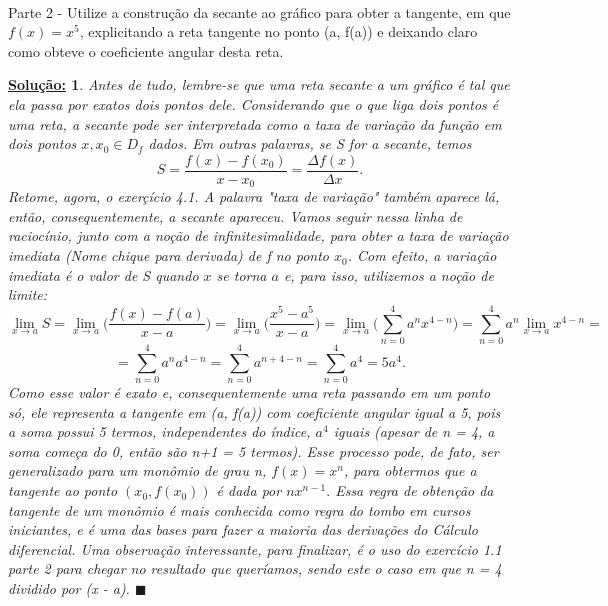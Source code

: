 \documentclass{article}
\newtheorem*{sol*}{\underline{Solu\c c\~ao:}}
\renewcommand\qedsymbol{$\blacksquare$}
\begin{document}
\paragraph{} Parte 2 - Utilize a constru\c c\~ao da secante ao gr\'afico para obter a tangente, em que $f(x) = x^5$, explicitando a reta tangente no ponto (a, f(a)) e deixando claro como obteve o coeficiente angular desta reta.
\begin{sol*}
	Antes de tudo, lembre-se que uma reta secante a um gr\'afico \'e tal que ela passa por exatos dois pontos dele. Considerando que o que liga dois pontos \'e uma reta, a secante pode ser interpretada como a taxa de varia\c c\~ao da fun\c c\~ao em dois pontos $x, x_0\in{D_f}$ dados. Em outras palavras, se S for a secante, temos
	$$
		S = \frac{f(x) - f(x_0)}{x - x_0} = \frac{\Delta{f(x)}}{\Delta{x}}.
	$$
	Retome, agora, o exer\c c\'icio 4.1. A palavra "taxa de varia\c c\~ao" tamb\'em aparece l\'a, ent\~ao, consequentemente, a secante apareceu. Vamos seguir nessa linha de racioc\'inio, junto com a no\c c\~ao de infinitesimalidade, para obter a taxa de varia\c c\~ao imediata (Nome chique para derivada) de f no ponto $x_0$. Com efeito, a varia\c c\~ao imediata \'e o valor de S quando $x$ se torna $a$ e, para isso, utilizemos a no\c c\~ao de limite:
	$$
		\lim_{x\to{a}} S = \lim_{x\to{a}}\biggl(\frac{f(x) - f(a)}{x - a}\biggr) = \lim_{x\to{a}}\biggl(\frac{x^5 - a^5}{x - a}\biggr) = \lim_{x\to{a}}\biggl(\sum_{n=0}^{4}a^nx^{4-n}\biggr) = \sum_{n=0}^{4}a^n\lim_{x\to{a}}x^{4-n}=
	$$
	$$
		= \sum_{n=0}^{4}a^na^{4-n} = \sum_{n=0}^{4}a^{n+4-n} = \sum_{n=0}^{4}a^4 = 5a^4 .
	$$
	Como esse valor \'e exato e, consequentemente uma reta passando em um ponto s\'o, ele representa a tangente em (a, f(a)) com coeficiente angular igual a 5, pois a soma possui 5 termos, independentes do \'indice, $a^4$ iguais (apesar de n = 4, a soma come\c ca do 0, ent\~ao s\~ao n+1 = 5 termos). Esse processo pode, de fato, ser generalizado para um mon\^omio de grau n, $f(x) = x^n$, para obtermos que a tangente ao ponto $(x_0, f(x_0))$ \'e dada por $nx^{n-1}.$ Essa regra de obten\c c\~ao da tangente de um mon\^omio \'e mais conhecida como regra do tombo em cursos iniciantes, e \'e uma das bases para fazer a maioria das deriva\c c\~oes do C\'alculo diferencial. Uma observa\c c\~ao interessante, para finalizar, \'e o uso do exerc\'icio 1.1 parte 2 para chegar no resultado que quer\'iamos, sendo este o caso em que n = 4 dividido por (x - a).
	\qedsymbol
\end{sol*}
\end{document}

